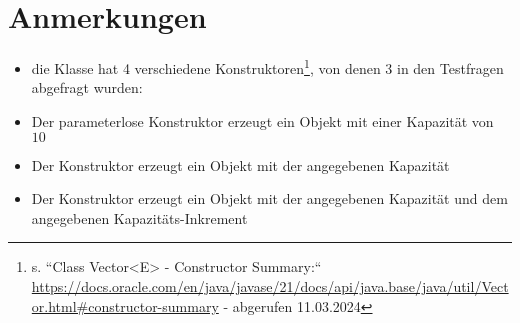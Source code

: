 \section{Anmerkungen}

\begin{itemize}
    \item die Klasse  hat 4 verschiedene Konstruktoren\footnote{
    s. ``Class Vector<E> - Constructor Summary:`` \url{https://docs.oracle.com/en/java/javase/21/docs/api/java.base/java/util/Vector.html#constructor-summary} - abgerufen 11.03.2024
    }, von denen 3 in den Testfragen abgefragt wurden:
    \item Der parameterlose Konstruktor erzeugt ein Objekt mit einer Kapazität von $10$
    \item Der Konstruktor  erzeugt ein Objekt mit der angegebenen Kapazität
    \item Der Konstruktor  erzeugt ein Objekt
     mit der angegebenen Kapazität und dem angegebenen Kapazitäts-Inkrement
\end{itemize}
\code{}